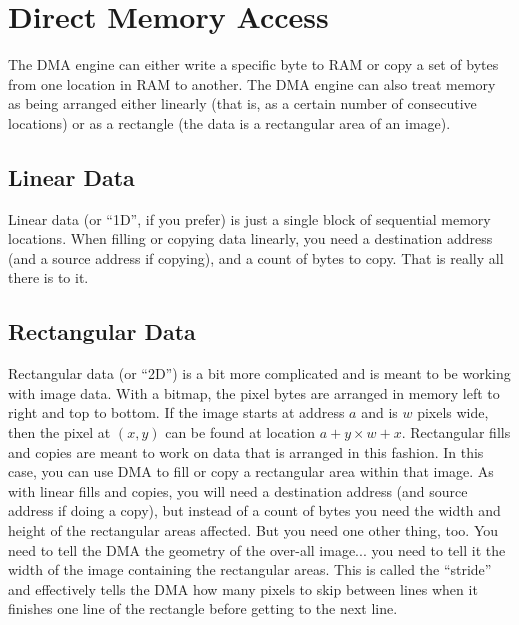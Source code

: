 \chapter{Direct Memory Access}

The DMA engine can either write a specific byte to RAM or copy a set of bytes from one location in RAM to another. The DMA engine can also treat memory as being arranged either linearly (that is, as a certain number of consecutive locations) or as a rectangle (the data is a rectangular area of an image).

\section*{Linear Data}
Linear data (or ``1D'', if you prefer) is just a single block of sequential memory locations. When filling or copying data linearly, you need a destination address (and a source address if copying), and a count of bytes to copy. That is really all there is to it.

\section*{Rectangular Data}
Rectangular data (or ``2D'') is a bit more complicated and is meant to be working with image data. With a bitmap, the pixel bytes are arranged in memory left to right and top to bottom. If the image starts at address $a$ and is $w$ pixels wide, then the pixel at $(x, y)$ can be found at location $a + y \times w + x$. Rectangular fills and copies are meant to work on data that is arranged in this fashion. In this case, you can use DMA to fill or copy a rectangular area within that image. As with linear fills and copies, you will need a destination address (and source address if doing a copy), but instead of a count of bytes you need the width and height of the rectangular areas affected. But you need one other thing, too. You need to tell the DMA the geometry of the over-all image... you need to tell it the width of the image containing the rectangular areas. This is called the ``stride'' and effectively tells the DMA how many pixels to skip between lines when it finishes one line of the rectangle before getting to the next line.

